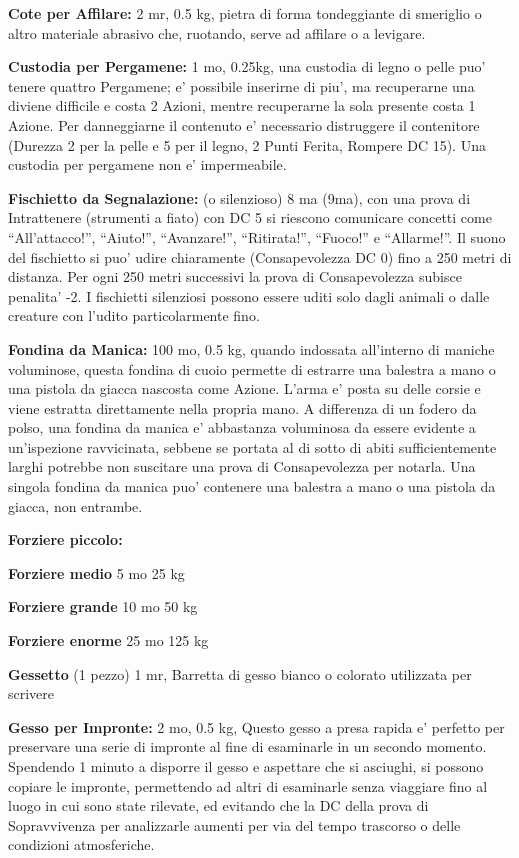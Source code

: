 \documentclass[a4paper,11pt,twoside,openany]{dndbook}
\begin{document}
{\textbf{Cote per Affilare:} 2 mr, 0.5 kg, pietra di forma tondeggiante di smeriglio o altro materiale abrasivo che, ruotando, serve ad affilare o a levigare.

\textbf{Custodia per Pergamene:} 1 mo, 0.25kg, una custodia di legno o pelle puo' tenere quattro Pergamene; e' possibile inserirne di piu', ma recuperarne una diviene difficile e costa 2 Azioni, mentre recuperarne la sola presente costa 1 Azione. Per danneggiarne il contenuto e' necessario distruggere il contenitore (Durezza 2 per la pelle e 5 per il legno, 2 Punti Ferita, Rompere DC 15). Una custodia per pergamene non e' impermeabile.

\textbf{Fischietto da Segnalazione:} (o silenzioso) 8 ma (9ma), con una prova di Intrattenere (strumenti a fiato) con DC 5 si riescono comunicare concetti come ``All'attacco!'', ``Aiuto!'', ``Avanzare!'', ``Ritirata!'', ``Fuoco!'' e ``Allarme!''. Il suono del fischietto si puo' udire chiaramente (Consapevolezza DC 0) fino a 250 metri di distanza. Per ogni 250 metri successivi la prova di Consapevolezza subisce penalita' -2. I fischietti silenziosi possono essere uditi solo dagli animali o dalle creature con l'udito particolarmente fino.

\textbf{Fondina da Manica:} 100 mo, 0.5 kg, quando indossata all'interno di maniche voluminose, questa fondina di cuoio permette di estrarre una balestra a mano o una pistola da giacca nascosta come Azione. L'arma e' posta su delle corsie e viene estratta direttamente nella propria mano. A differenza di un fodero da polso, una fondina da manica e' abbastanza voluminosa da essere evidente a un'ispezione ravvicinata, sebbene se portata al di sotto di abiti sufficientemente larghi potrebbe non suscitare una prova di Consapevolezza per notarla. Una singola fondina da manica puo' contenere una balestra a mano o una pistola da giacca, non entrambe.

\textbf{Forziere piccolo:}

\textbf{Forziere medio} 5 mo 25 kg

\textbf{Forziere grande} 10 mo 50 kg

\textbf{Forziere enorme} 25 mo 125 kg

\textbf{Gessetto} (1 pezzo) 1 mr, Barretta di gesso bianco o colorato utilizzata per scrivere

\textbf{Gesso per Impronte:} 2 mo, 0.5 kg, Questo gesso a presa rapida e' perfetto per preservare una serie di impronte al fine di esaminarle in un secondo momento. Spendendo 1 minuto a disporre il gesso e aspettare che si asciughi, si possono copiare le impronte, permettendo ad altri di esaminarle senza viaggiare fino al luogo in cui sono state rilevate, ed evitando che la DC della prova di Sopravvivenza per analizzarle aumenti per via del tempo trascorso o delle condizioni atmosferiche. 

}
\end{document}
